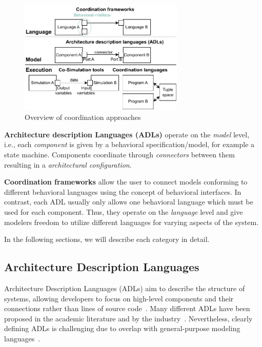 \documentclass[runningheads]{llncs}
\begin{document}
\begin{figure}[ht]
	\centering
	\includegraphics[width=0.7\textwidth]{images/overview}
	\caption{Overview of coordination approaches}
	\label{fig:overview}
\end{figure}

\textbf{Architecture description Languages (ADLs)} operate on the \textit{model} level, i.e., each \textit{component} is given by a behavioral specification/model, for example a state machine.
Components coordinate through \textit{connectors} between them resulting in a \textit{architectural configuration}.

\textbf{Coordination frameworks} allow the user to connect models conforming to different behavioral languages using the concept of behavioral interfaces.
In contrast, each ADL usually only allows one behavioral language which must be used for each component.
Thus, they operate on the \textit{language} level and give modelers freedom to utilize different languages for varying aspects of the system.

In the following sections, we will describe each category in detail.

\subsection{Architecture Description Languages} \label{subsec:adl}
Architecture Description Languages (ADLs) aim to describe the structure of systems, allowing developers to focus on high-level components and their connections rather than lines of source code~\cite{clementsSurveyArchitectureDescription1996,medvidovicClassificationComparisonFramework2000,medvidovicFrameworkClassifyingComparing1997}.
Many different ADLs have been proposed in the academic literature and by the industry~\cite{medvidovicClassificationComparisonFramework2000,woodsArchitectureDescriptionLanguages2005}.
Nevertheless, clearly defining ADLs is challenging due to overlap with general-purpose modeling languages~\cite{clementsSurveyArchitectureDescription1996}.
\end{document}
